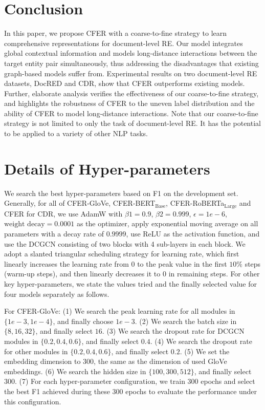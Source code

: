 \documentclass{article}
\begin{document}
\section{Conclusion}

In this paper, we propose CFER with a coarse-to-fine strategy to learn comprehensive representations for document-level RE. 
Our model integrates global contextual information and models long-distance interactions between the target entity pair simultaneously, thus addressing the disadvantages that existing graph-based models suffer from. 
Experimental results on two document-level RE datasets, DocRED and CDR, show that CFER outperforms existing models. 
Further, elaborate analysis verifies the effectiveness of our coarse-to-fine strategy, and highlights the robustness of CFER to the uneven label distribution and the ability of CFER to model long-distance interactions. 
Note that our coarse-to-fine strategy is not limited to only the task of document-level RE. 
It has the potential to be applied to a variety of other NLP tasks.

\small
 


\appendix
\appendixpage

\section{Details of Hyper-parameters}

We search the best hyper-parameters based on F1 on the development set. 
Generally, for all of CFER-GloVe, CFER-BERT$_{\text{Base}}$, CFER-RoBERTa$_{\text{Large}}$ and CFER for CDR, we use AdamW with $\beta1=0.9$, $\beta2=0.999$, $\epsilon=1e-6$, $\text{weight decay}=0.0001$ as the optimizer, apply exponential moving average on all parameters with a decay rate of $0.9999$, use ReLU as the activation function, and use the DCGCN consisting of two blocks with 4 sub-layers in each block. 
We adopt a slanted triangular scheduling strategy for learning rate, which first linearly increases the learning rate from $0$ to the peak value in the first $10\%$ steps (warm-up steps), and then linearly decreases it to $0$ in remaining steps. 
For other key hyper-parameters, we state the values tried and the finally selected value for four models separately as follows. 

For CFER-GloVe: 
(1) We search the peak learning rate for all modules in $\{1e-3, 1e-4\}$, and finally choose $1e-3$. 
(2) We search the batch size in $\{8, 16, 32\}$, and finally select $16$.
(3) We search the dropout rate for DCGCN modules in $\{0.2, 0.4, 0.6\}$, and finally select $0.4$.
(4) We search the dropout rate for other modules in $\{0.2, 0.4, 0.6\}$, and finally select $0.2$.
(5) We set the embedding dimension to $300$, the same as the dimension of used GloVe embeddings. 
(6) We search the hidden size in $\{100, 300, 512\}$, and finally select $300$. 
(7) For each hyper-parameter configuration, we train $300$ epochs and select the best F1 achieved during these $300$ epochs to evaluate the performance under this configuration. 
\end{document}
